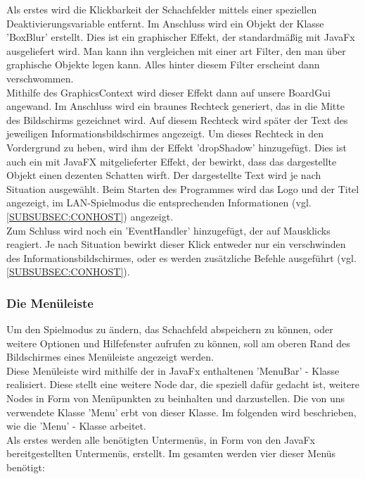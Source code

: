 \documentclass[12pt,a4paper]{article}
\begin{document}
{Als erstes wird die Klickbarkeit der Schachfelder mittels einer speziellen Deaktivierungsvariable entfernt. Im Anschluss wird ein Objekt der Klasse 'BoxBlur' erstellt. Dies ist ein graphischer Effekt, der standardmäßig mit JavaFx ausgeliefert wird. Man kann ihn vergleichen mit einer art Filter, den man über graphische Objekte legen kann. Alles hinter diesem Filter erscheint dann verschwommen. \\
Mithilfe des GraphicsContext wird dieser Effekt dann auf unsere BoardGui angewand. 
Im Anschluss wird ein braunes Rechteck generiert, das in die Mitte des Bildschirms gezeichnet wird. Auf diesem Rechteck wird später der Text des jeweiligen Informationsbildschirmes angezeigt. Um dieses Rechteck in den Vordergrund zu heben, wird ihm der Effekt 'dropShadow' hinzugefügt. Dies ist auch ein mit JavaFX mitgelieferter Effekt, der bewirkt, dass das dargestellte Objekt einen dezenten Schatten wirft.
Der dargestellte Text wird je nach Situation ausgewählt. Beim Starten des Programmes wird das Logo und der Titel angezeigt, im LAN-Spielmodus die entsprechenden Informationen (vgl. \ref{SUBSUBSEC:CONHOST}) angezeigt. \\
Zum Schluss wird noch ein 'EventHandler' hinzugefügt, der auf Mausklicks reagiert. Je nach Situation bewirkt dieser Klick entweder nur ein verschwinden des Informationsbildschirmes, oder es werden zusätzliche Befehle ausgeführt (vgl. \ref{SUBSUBSEC:CONHOST}). \\




\subsubsection{Die Menüleiste}
Um den Spielmodus zu ändern, das Schachfeld abspeichern zu können, oder weitere Optionen und Hilfefenster aufrufen zu können, soll am oberen Rand des Bildschirmes eines Menüleiste angezeigt werden. \\
Diese Menüleiste wird mithilfe der in JavaFx enthaltenen 'MenuBar' - Klasse realisiert. Diese stellt eine weitere Node dar, die speziell dafür gedacht ist, weitere Nodes in Form von Menüpunkten zu beinhalten und darzustellen.  Die von uns verwendete Klasse 'Menu' erbt von dieser Klasse. Im folgenden wird beschrieben, wie die 'Menu' - Klasse arbeitet. \\
Als erstes werden alle benötigten Untermenüs, in Form von den JavaFx bereitgestellten Untermenüs, erstellt. Im gesamten werden vier dieser Menüs benötigt:
\begin{itemize}


\end{itemize}}
\end{document}
